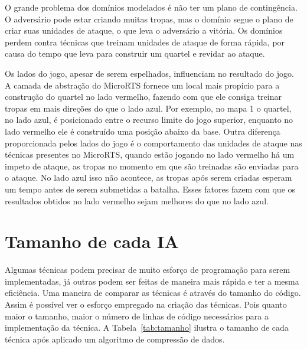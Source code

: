 O grande problema dos domínios modelados é não ter um plano de contingência.
O adversário pode estar criando muitas tropas, mas o domínio segue o plano de criar suas unidades de ataque, o que leva o adversário a vitória.
Os domínios perdem contra técnicas que treinam unidades de ataque de forma rápida, por causa do tempo que leva para construir um quartel e revidar ao ataque.

Os lados do jogo, apesar de serem espelhados, influenciam no resultado do jogo.
A camada de abstração do MicroRTS fornece um local mais propicio para a construção do quartel no lado vermelho, fazendo com que ele consiga treinar tropas em mais direções do que o lado azul.
Por exemplo, no mapa 1 o quartel, no lado azul, é posicionado entre o recurso limite do jogo superior, enquanto no lado vermelho ele é construído uma posição abaixo da base.
Outra diferença proporcionada pelos lados do jogo é o comportamento das unidades de ataque nas técnicas presentes no MicroRTS, quando estão jogando no lado vermelho há um impeto de ataque, as tropas no momento em que são treinadas são enviadas para o ataque.
No lado azul isso não acontece, as tropas após serem criadas esperam um tempo antes de serem submetidas a batalha.
Esses fatores fazem com que os resultados obtidos no lado vermelho sejam melhores do que no lado azul.

 \section{Tamanho de cada IA}

Algumas técnicas podem precisar de muito esforço de programação para serem implementadas, já outras podem ser feitas de maneira mais rápida e ter a mesma eficiência.
Uma maneira de comparar as técnicas é através do tamanho do código.
Assim é possível ver o esforço empregado na criação das técnicas.
Pois quanto maior o tamanho, maior o número de linhas de código necessários para a implementação da técnica.
A Tabela~\ref{tab:tamanho} ilustra o tamanho de cada técnica após aplicado um algoritmo de compressão de dados.

